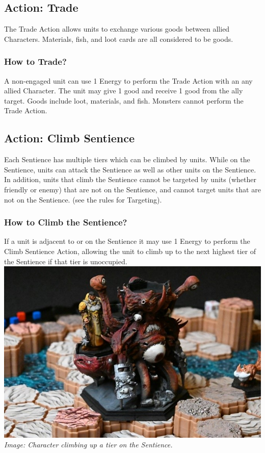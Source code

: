 \documentclass[../main.tex]{subfiles}
\begin{document}
\subsection{Action: Trade}
The Trade Action allows units to exchange various goods between allied Characters. Materials, fish, and loot cards are all considered to be goods.

\subsubsection{How to Trade? }
A non-engaged unit can use 1 Energy to perform the Trade Action with an any allied Character. The unit may give 1 good and receive 1 good from the ally target. Goods include loot, materials, and fish. Monsters cannot perform the Trade Action.

\subsection{Action: Climb Sentience}
Each Sentience has multiple tiers which can be climbed by units. While on the Sentience, units can attack the Sentience as well as other units on the Sentience. In addition, units that climb the Sentience cannot be targeted by units (whether friendly or enemy) that are not on the Sentience, and cannot target units that are not on the Sentience. (see the rules for Targeting). 

\subsubsection{How to Climb the Sentience?}
If a unit is adjacent to or on the Sentience it may use 1 Energy to perform the Climb Sentience Action, allowing the unit to climb up to the next highest tier of the Sentience if that tier is unoccupied.
\centering
    \includegraphics[width=1\linewidth]{chapters//ActionsandEnergy/TimeStrikeClimbSentience.jpg}
\textit{Image: Character climbing up a tier on the Sentience.}
\end{document}
